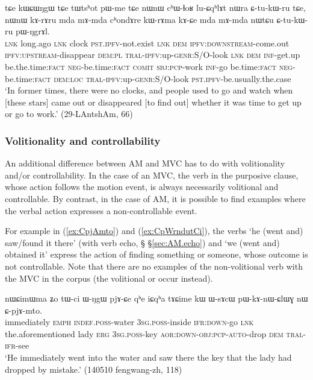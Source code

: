  \begin{exe}
\ex \label{ex:kWrAma.kACe}
\gll  tɕe kɯɕɯŋgɯ tɕe tɯtsʰot pɯ-me tɕe  nɯnɯ cʰɯ-ɬoʁ lu-ɕqʰlɤt nɯra ɕ-tu-kɯ-ru tɕe, nɯnɯ kɤ-rɤru mda mɤ-mda cʰondɤre kɯ-rɤma kɤ-ɕe mda mɤ-mda nɯtɕu ɕ-tu-kɯ-ru pɯ-ŋgrɤl. \\
 \textsc{lnk} long.ago \textsc{lnk} clock \textsc{pst}.\textsc{ipfv}-not.exist \textsc{lnk} \textsc{dem} \textsc{ipfv}:\textsc{downstream}-come.out \textsc{ipfv}:\textsc{upstream}-disappear \textsc{dem}:\textsc{pl} \textsc{tral}-\textsc{ipfv}:up-\textsc{genr}:S/O-look \textsc{lnk} \textsc{dem} \textsc{inf}-get.up be.the.time:\textsc{fact} \textsc{neg}-be.time:\textsc{fact} \textsc{comit} \textsc{sbj}:\textsc{pcp}-work \textsc{inf}-go be.time:\textsc{fact} \textsc{neg}-be.time:\textsc{fact} \textsc{dem}:\textsc{loc} \textsc{tral}-\textsc{ipfv}:up-\textsc{genr}:S/O-look \textsc{pst}.\textsc{ipfv}-be.usually.the.case  \\
 \glt  `In former times, there were no clocks, and people used to go and watch when [these stars] came out or disappeared [to find out] whether it was time to get up or go to work.' (29-LAntshAm, 66)
  \end{exe}
  
\subsubsection{Volitionality and controllability} \label{sec:AM.volitionality}
An additional difference between AM and MVC has to do with volitionality and/or controllability. In the case of an MVC, the verb in the purposive clause, whose action follows the motion event, is always necessarily volitional and controllable. By contrast, in the case of AM, it is possible to find examples where the verbal action expresses a non-controllable event.

For example in (\ref{ex:CpjAmto}) and (\ref{ex:CpWrndutCi}), the verbs  `he (went and) saw/found it there'  (with verb echo, § §\ref{sec:AM.echo})  and  `we (went and) obtained it' express the action of finding something or someone, whose outcome is not controllable. Note that there are no examples of the non-volitional verb  with the MVC in the corpus (the volitional  or  occur instead). 


\begin{exe}
\ex  \label{ex:CpjAmto}
\gll  nɯɕimɯma ʑo tɯ-ci ɯ-ŋgɯ pjɤ-ɕe qʰe iɕqʰa tɤɕime kɯ ɯ-sɤcɯ pɯ-kɤ-nɯ-ɕlɯɣ nɯ ɕ-pjɤ-mto. \\
immediately \textsc{emph} \textsc{indef}.\textsc{poss}-water \textsc{3sg}.\textsc{poss}-inside \textsc{ifr}:\textsc{down}-go \textsc{lnk} the.aforementioned lady \textsc{erg} \textsc{3sg}.\textsc{poss}-key \textsc{aor}:\textsc{down}-\textsc{obj}:\textsc{pcp}-\textsc{auto}-drop \textsc{dem} \textsc{tral}-\textsc{ifr}-see \\
\glt `He immediately went into the water and saw there the key that the lady had dropped by mistake.' (140510 fengwang-zh, 118)
\end{exe}

